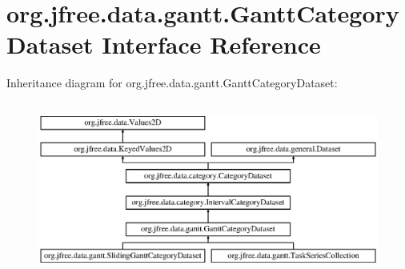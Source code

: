 \hypertarget{interfaceorg_1_1jfree_1_1data_1_1gantt_1_1_gantt_category_dataset}{}\section{org.\+jfree.\+data.\+gantt.\+Gantt\+Category\+Dataset Interface Reference}
\label{interfaceorg_1_1jfree_1_1data_1_1gantt_1_1_gantt_category_dataset}
Inheritance diagram for org.\+jfree.\+data.\+gantt.\+Gantt\+Category\+Dataset\+:\begin{figure}[H]
\begin{center}
\leavevmode
\includegraphics[height=5.733788cm]{interfaceorg_1_1jfree_1_1data_1_1gantt_1_1_gantt_category_dataset}
\end{center}
\end{figure}
